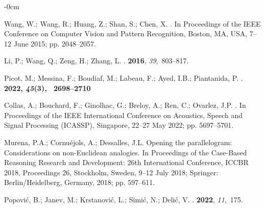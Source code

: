 \documentclass[entropy,article,accept,oneauthor,pdftex,entropy]{Definitions/mdpi}
\begin{document}
\begin{adjustwidth}{-\extralength}{0cm}
\begin{thebibliography}{999}
Wang, W.; Wang, R.; Huang, Z.; Shan, S.; Chen, X.
.
\newblock In Proceedings of the IEEE Conference on Computer
  Vision and Pattern Recognition, {Boston, MA, USA}, {7--12 June 2015}; pp. 2048--2057.

Li, P.; Wang, Q.; Zeng, H.; Zhang, L.
.
  {\bf 2016}, {\em 39},~803--817.

Picot, M.; Messina, F.; Boudiaf, M.; Labeau, F.; Ayed, I.B.; Piantanida, P.
.
  \bf {2022}, {\em 45}(3),~ 2698--2710 

 

Collas, A.; Bouchard, F.; Ginolhac, G.; Breloy, A.; Ren, C.; Ovarlez, J.P.
.
\newblock In Proceedings of the IEEE International Conference on Acoustics,
  Speech and Signal Processing (ICASSP), {Singapore, 22--27 May 2022;} pp. 5697--5701.

Murena, P.A.; Cornu{\'e}jols, A.; Dessalles, J.L.
\newblock Opening the parallelogram: Considerations on non-Euclidean analogies.
\newblock In Proceedings of the Case-Based Reasoning Research and Development:
  26th International Conference, ICCBR 2018, Proceedings 26, Stockholm, Sweden, 9--12 July 2018; Springer: {Berlin/Heidelberg, Germany,} %
2018; pp. 597--611.

Popovi{\'c}, B.; Janev, M.; Krstanovi{\'c}, L.; Simi{\'c}, N.; Deli{\'c}, V.
.
 {\bf 2022}, {\em 11},~175.


\end{thebibliography}
\end{adjustwidth}
\end{document}
